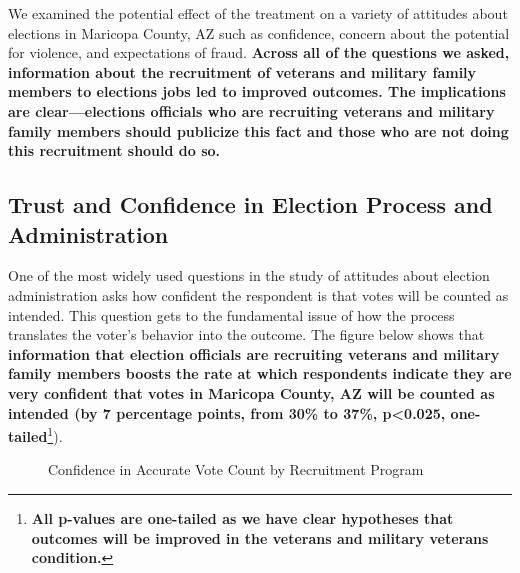 \documentclass[
  11pt,
  a4paper,
]{article}
\begin{document}
We examined the potential effect of the treatment on a variety of
attitudes about elections in Maricopa County, AZ such as confidence,
concern about the potential for violence, and expectations of fraud.
\textbf{Across all of the questions we asked, information about the
recruitment of veterans and military family members to elections jobs
led to improved outcomes. The implications are clear---elections
officials who are recruiting veterans and military family members should
publicize this fact and those who are not doing this recruitment should
do so.}

\subsection{Trust and Confidence in Election Process and
Administration}\label{trust-and-confidence-in-election-process-and-administration}

One of the most widely used questions in the study of attitudes about
election administration asks how confident the respondent is that votes
will be counted as intended. This question gets to the fundamental issue
of how the process translates the voter's behavior into the outcome. The
figure below shows that \textbf{information that election officials are
recruiting veterans and military family members boosts the rate at which
respondents indicate they are very confident that votes in Maricopa
County, AZ will be counted as intended (by 7 percentage points, from
30\% to 37\%, p\textless0.025, one-tailed}\footnote{\textbf{All p-values
  are one-tailed as we have clear hypotheses that outcomes will be
  improved in the veterans and military veterans condition.}}).

\begin{figure}

\caption{\label{fig-q19-likert}Confidence in Accurate Vote Count by
Recruitment Program}


\end{figure}%
\end{document}
